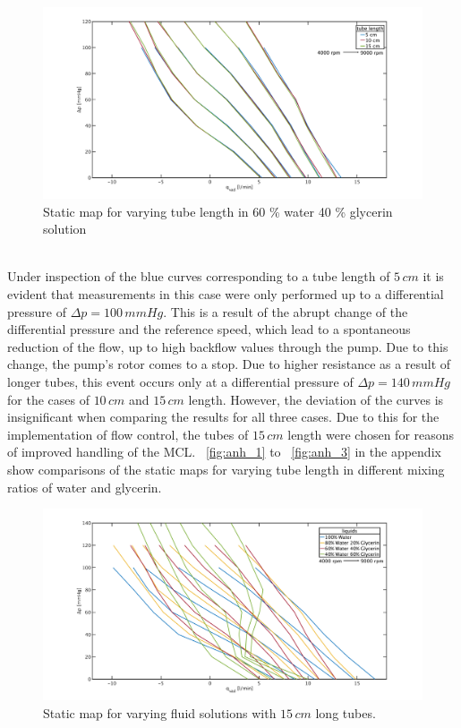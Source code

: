 \begin{figure}[ht]
  \flushleft
  \includegraphics[width=\textwidth]{images/plots_syst_ident/60w40g_tube_length_new.pdf}
  \caption[Static map for different tube length in 60 \% water 40 \% glycerin solution]{Static map for varying tube length in 60 \% water 40 \% glycerin solution}
  \label{fig:60w_40g}
\end{figure}
\\Under inspection of the blue curves corresponding to a tube length of $5\, cm$ it is evident that measurements in this case were only performed up to a differential pressure of $\Delta{p}=100 \, mmHg$. This is a result of the abrupt change of the differential pressure and the reference speed, which lead to a spontaneous reduction of the flow, up to high backflow values through the pump. Due to this change, the pump's rotor comes to a stop. Due to higher resistance as a result of longer tubes, this event occurs only at a differential pressure of $\Delta{p}=140\, mmHg$ for the cases of $10\, cm$ and $15\, cm$ length. However, the deviation of the curves is insignificant when comparing the results for all three cases. Due to this for the implementation of flow control, the tubes of $15\, cm$ length were chosen for reasons of improved handling of the MCL. \figurename~\ref{fig:anh_1} to \figurename~\ref{fig:anh_3} in the appendix show comparisons of the static maps for varying tube length in different mixing ratios of water and glycerin.
\begin{figure}[ht]
  \flushleft
  \includegraphics[width=\textwidth]{images/plots_syst_ident/long_liquid_change_new.pdf}
  \caption[Static map for varying fluid solution with $15\,cm$ long tubes]{Static map for varying fluid solutions with $15\,cm$ long tubes.}
  \label{fig:long_tubes}
\end{figure}
